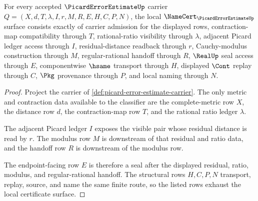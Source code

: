 \begin{theorem}\label{thm:picard-error-estimate-namecert-obligations}
For every accepted $\PicardErrorEstimateUp$ carrier $Q=(X,d,T,\lambda,I,r,M,R,E,H,C,P,N)$, the local $\NameCert_{\PicardErrorEstimateUp}$ surface consists exactly of carrier admission for the displayed rows, contraction-map compatibility through $T$, rational-ratio visibility through $\lambda$, adjacent Picard ledger access through $I$, residual-distance readback through $r$, Cauchy-modulus construction through $M$, regular-rational handoff through $R$, $\RealUp$ seal access through $E$, componentwise $\hsame$ transport through $H$, displayed $\Cont$ replay through $C$, $\Pkg$ provenance through $P$, and local naming through $N$.
\end{theorem}
\begin{proof}
Project the carrier of \autoref{def:picard-error-estimate-carrier}. The only metric and contraction data available to the classifier are the complete-metric row $X$, the distance row $d$, the contraction-map row $T$, and the rational ratio ledger $\lambda$.

The adjacent Picard ledger $I$ exposes the visible pair whose residual distance is read by $r$. The modulus row $M$ is downstream of that residual and ratio data, and the handoff row $R$ is downstream of the modulus row.

The endpoint-facing row $E$ is therefore a seal after the displayed residual, ratio, modulus, and regular-rational handoff. The structural rows $H,C,P,N$ transport, replay, source, and name the same finite route, so the listed rows exhaust the local certificate surface.
\end{proof}

